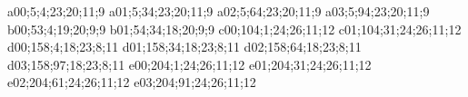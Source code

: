 a00;5;4;23;20;11;9
a01;5;34;23;20;11;9
a02;5;64;23;20;11;9
a03;5;94;23;20;11;9
b00;53;4;19;20;9;9
b01;54;34;18;20;9;9
c00;104;1;24;26;11;12
c01;104;31;24;26;11;12
d00;158;4;18;23;8;11
d01;158;34;18;23;8;11
d02;158;64;18;23;8;11
d03;158;97;18;23;8;11
e00;204;1;24;26;11;12
e01;204;31;24;26;11;12
e02;204;61;24;26;11;12
e03;204;91;24;26;11;12

